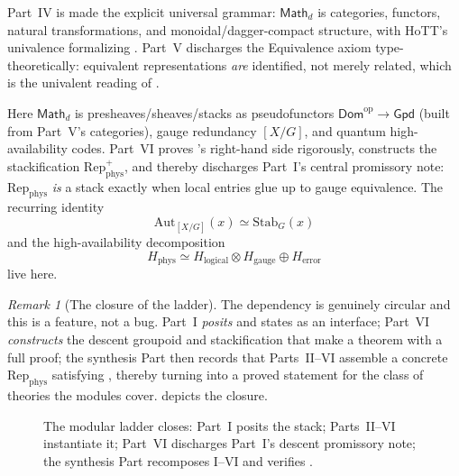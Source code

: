 \documentclass[12pt]{article}
\theoremstyle{definition}
\theoremstyle{remark}
\newtheorem{remark}[theorem]{Remark}
\newcommand{\Dom}{\mathsf{Dom}}
\newcommand{\Math}{\mathsf{Math}}
\newcommand{\Gpd}{\mathsf{Gpd}}
\newcommand{\Repphys}{\mathrm{Rep}_{\mathrm{phys}}}
\newcommand{\Aut}{\mathrm{Aut}}
\newcommand{\Stab}{\mathrm{Stab}}
\newcommand{\op}{\mathrm{op}}
\begin{document}
\begin{description}[leftmargin=1.4em, style=nextline]
  Part~IV is made the explicit universal grammar: $\Math_d$ is categories,
  functors, natural transformations, and monoidal/dagger-compact structure, with
  HoTT's univalence formalizing . Part~V discharges the
  Equivalence axiom type-theoretically: equivalent representations \emph{are}
  identified, not merely related, which is the univalent reading of
  .
\item[Part~VI (Sheaves, stacks, gauge, quantum HA).] Here $\Math_d$ is
  presheaves/sheaves/stacks as pseudofunctors $\Dom^{\op} \to \Gpd$ (built from
  Part~V's categories), gauge redundancy $[X/G]$, and quantum high-availability
  codes. Part~VI proves 's right-hand side rigorously,
  constructs the stackification $\Repphys^+$, and thereby discharges Part~I's
  central promissory note: $\Repphys$ \emph{is} a stack exactly when local
  entries glue up to gauge equivalence. The recurring identity
  \[
    \Aut_{[X/G]}(x) \simeq \Stab_G(x)
  \]
  and the high-availability decomposition
  \[
    H_{\text{phys}} \simeq H_{\text{logical}} \otimes H_{\text{gauge}}
      \oplus H_{\text{error}}
  \]
  live here.
\end{description}

\begin{remark}[The closure of the ladder]
\label{rem:closure}
The dependency is genuinely circular and this is a feature, not a bug. Part~I
\emph{posits}  and states  as an interface;
Part~VI \emph{constructs} the descent groupoid and stackification that make
 a theorem with a full proof; the synthesis Part then records
that Parts~II--VI assemble a concrete $\Repphys$ satisfying ,
thereby turning  into a proved statement for the class of
theories the modules cover.  depicts the closure.
\end{remark}

\begin{figure}[htbp]
\centering
{}
\caption{The modular ladder closes: Part~I posits the stack; Parts~II--VI
instantiate it; Part~VI discharges Part~I's descent promissory note; the
synthesis Part recomposes I--VI and verifies .}
\label{fig:ladder}
\end{figure}
\end{document}

